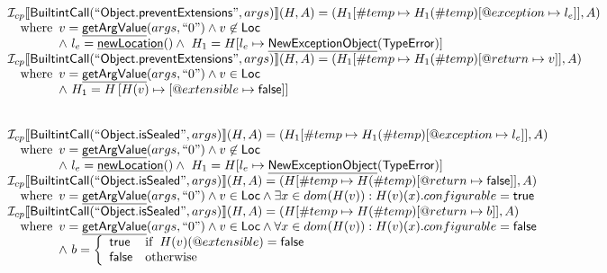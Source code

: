 \documentclass{article}
\makeatletter
\newcommand{\SF}[1]{\mbox{\textsf{#1}}}
\newcommand{\wherec}[1]{{\rm where}\begin{array}[t]{l}#1\end{array}}
\newcommand{\ifc}[1]{{\rm if}\begin{array}[t]{l}#1\end{array}}
\newcommand{\owc}{{\rm otherwise}}
\newcommand{\Loc}{\SF{Loc}}
\newcommand{\I}{\mathcal{I}}
\newcommand{\lbr}{\llbracket}
\newcommand{\rbr}{\rrbracket}
\newcommand{\hf}[1]{\underline{\sf #1}}
\newcommand{\varloc}[1]{\##1}
\newcommand{\varprop}[1]{@#1}
\makeatother
\begin{document}
\[
\begin{array}{l}

\I _{cp}\lbr \SF{BuiltintCall}(``\SF{Object.preventExtensions}",args)\rbr(H,A)
 = (H_1[\varloc{temp}\mapsto H_1(\varloc{temp})[\varprop{exception}\mapsto l_{e}]], A) \\
\quad\wherec{
  v = \hf{getArgValue}(args, ``0") \land v\not\in\Loc\\
  \land\ l_e = \hf{newLocation}() \land\ H_1=H[l_e\mapsto\hf{NewExceptionObject}(\SF{TypeError})] }\\
  
\I _{cp}\lbr \SF{BuiltintCall}(``\SF{Object.preventExtensions}",args)\rbr(H,A)
 = (H_1[\varloc{temp}\mapsto H_1(\varloc{temp})[\varprop{return}\mapsto v]], A) \\
\quad\wherec{
  v = \hf{getArgValue}(args, ``0") \land v  \in\Loc\\
  \land\ H_1 = H\left[H(v) \mapsto [\varprop{extensible} \mapsto \SF{false}]\right]\\
   }\\
\\\\


\I _{cp}\lbr \SF{BuiltintCall}(``\SF{Object.isSealed}",args)\rbr(H,A)
 = (H_1[\varloc{temp}\mapsto H_1(\varloc{temp})[\varprop{exception}\mapsto l_{e}]], A) \\
\quad\wherec{
  v = \hf{getArgValue}(args, ``0") \land v\not\in\Loc\\
  \land\ l_e = \hf{newLocation}() \land\ H_1=H[l_e\mapsto\hf{NewExceptionObject}(\SF{TypeError})] }\\
  
\I _{cp}\lbr \SF{BuiltintCall}(``\SF{Object.isSealed}",args)\rbr(H,A)
 = (H[\varloc{temp}\mapsto H(\varloc{temp})[\varprop{return}\mapsto \SF{false}]], A) \\
\quad\wherec{
  v = \hf{getArgValue}(args, ``0") \land v  \in\Loc
  \land \exists x \in dom(H(v)) : H(v)(x).configurable = \SF{true}
  }\\
   
\I _{cp}\lbr \SF{BuiltintCall}(``\SF{Object.isSealed}",args)\rbr(H,A)
 = (H[\varloc{temp}\mapsto H(\varloc{temp})[\varprop{return}\mapsto b]], A) \\
\quad\wherec{
  v = \hf{getArgValue}(args, ``0") \land v  \in\Loc
  \land \forall x \in dom(H(v)) : H(v)(x).configurable = \SF{false}\\
  \land\ b = \left\{
    \begin{array}{ll}
      \SF{true} & \ifc{H(v)(@extensible) = \SF{false}}\\
      \SF{false} & \owc
    \end{array}\right.
   }\\
\\\\


\end{array}\]
\end{document}
